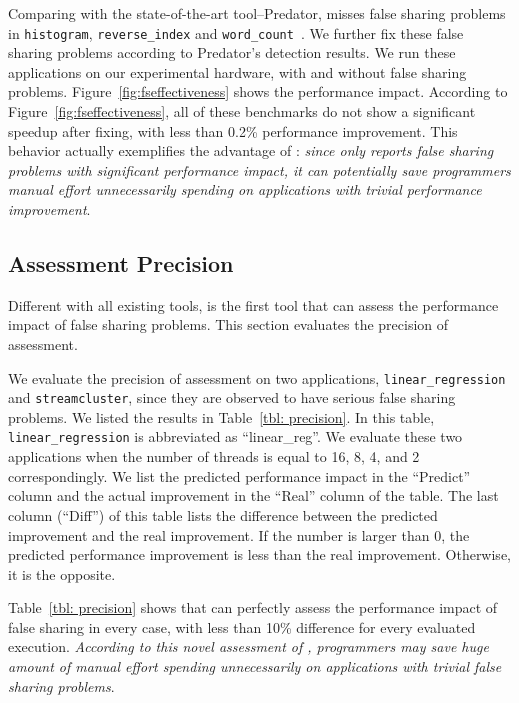Comparing with the state-of-the-art tool--Predator, \cheetah{} misses false sharing problems in  \texttt{histogram}, \texttt{reverse\_index} and \texttt{word\_count}~\cite{Predator}. We further fix these false sharing problems according to Predator's detection results. We run these applications on our experimental hardware, with and without false sharing problems. Figure~\ref{fig:fseffectiveness} shows the performance impact. According to Figure~\ref{fig:fseffectiveness}, all of these benchmarks do not show a significant speedup after fixing, with less than 0.2\% performance improvement. This behavior actually exemplifies the advantage of \Cheetah{}: \emph{since \cheetah{} only reports false sharing problems with significant performance impact, it can potentially save programmers manual effort unnecessarily spending on applications with trivial performance improvement}. 

\subsection{Assessment Precision}
\label{sec:precision}

Different with all existing tools, \cheetah{} is the first tool that can assess the performance impact of false sharing problems. This section evaluates the precision of assessment. 

We evaluate the precision of assessment on two applications, \texttt{linear\_regression} and \texttt{streamcluster}, since they are observed to have serious false sharing problems. We listed the results in Table~\ref{tbl: precision}. In this table, \texttt{linear\_regression} is abbreviated as ``linear\_reg''.  We evaluate these two applications when the number of threads is equal to 16, 8, 4, and 2 correspondingly. We list the predicted performance impact in the ``Predict'' column and the actual improvement in the ``Real'' column of the table. The last column (``Diff'') of this table lists the difference between the predicted improvement and the real improvement. If the number is larger than 0, the predicted performance improvement is less than the real improvement. Otherwise, it is the opposite. 

Table~\ref{tbl: precision} shows that \cheetah{} can perfectly assess the performance impact of false sharing in every case, with less than 10\% difference for every evaluated execution. %
\emph{According to this novel assessment of \cheetah{}, programmers may save huge amount of manual effort spending unnecessarily on applications with trivial false sharing problems}. 

